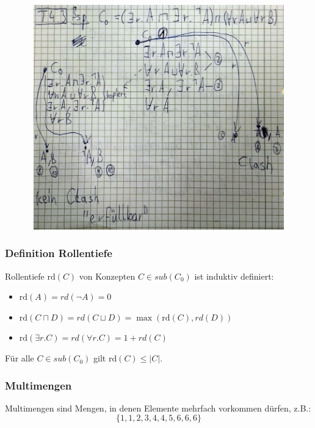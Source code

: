 \includegraphics[width=5.71910in,height=3.83200in]{media/43taleau.png}

\subsubsection{Definition Rollentiefe}\label{definition-rollentiefe}

Rollentiefe $\text{rd}\left( C \right)$ von Konzepten
$C \in sub\left( C_{0} \right)$ ist induktiv definiert:

\begin{itemize}
\item
  $\text{rd}\left( A \right) = rd\left( \neg A \right) = 0$
\item
  $\text{rd}\left( C \sqcap D \right) = rd\left( C \sqcup D \right) = \max\left( \text{rd}\left( C \right),rd\left( D \right) \right)$
\item
  $\text{rd}\left( \exists r.C \right) = rd\left( \forall r.C \right) = 1 + rd\left( C \right)$
\end{itemize}

\begin{lemma}
Für alle $C \in sub\left( C_{0} \right)$ gilt
$\text{rd}\left( C \right) \leq \left| C \right|$.
\end{lemma}

\subsubsection{Multimengen}\label{multimengen}

Multimengen sind Mengen, in denen Elemente mehrfach vorkommen dürfen, z.B.:
$$\{1,1,2,3,4,4,5,6,6,6\}$$

